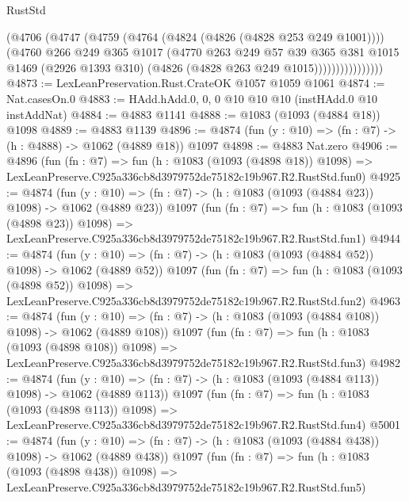 \begin{lexlean}{RustStd}
\begin{coremodule}
                      (@4706
                        (@4747
                          (@4759
                            (@4764 (@4824 (@4826 (@4828 @253 @249 @1001))))
                            (@4760
                              @266
                              @249
                              @365
                              @1017
                              (@4770
                                @263
                                @249
                                @57
                                @39
                                @365
                                @381
                                @1015
                                @1469
                                (@2926 @1393 @310)
                                (@4826 (@4828 @263 @249 @1015))))))))))))))))
@4873 := LexLeanPreservation.Rust.CrateOK @1057 @1059 @1061
@4874 := Nat.casesOn.{0}
@4883 := HAdd.hAdd.{0, 0, 0} @10 @10 @10 (instHAdd.{0} @10 instAddNat)
@4884 := @4883 @1141
@4888 := @1083 (@1093 (@4884 @18)) @1098
@4889 := @4883 @1139
@4896 := @4874 (fun (y : @10) => (fn : @7) -> (h : @4888) -> @1062 (@4889 @18)) @1097
@4898 := @4883 Nat.zero
@4906 := @4896
    (fun (fn : @7) =>
    fun (h : @1083 (@1093 (@4898 @18)) @1098) =>
    LexLeanPreserve.C925a336cb8d3979752de75182c19b967.R2.RustStd.fun0)
@4925 := @4874
    (fun (y : @10) => (fn : @7) -> (h : @1083 (@1093 (@4884 @23)) @1098) -> @1062 (@4889 @23))
    @1097
    (fun (fn : @7) =>
    fun (h : @1083 (@1093 (@4898 @23)) @1098) =>
    LexLeanPreserve.C925a336cb8d3979752de75182c19b967.R2.RustStd.fun1)
@4944 := @4874
    (fun (y : @10) => (fn : @7) -> (h : @1083 (@1093 (@4884 @52)) @1098) -> @1062 (@4889 @52))
    @1097
    (fun (fn : @7) =>
    fun (h : @1083 (@1093 (@4898 @52)) @1098) =>
    LexLeanPreserve.C925a336cb8d3979752de75182c19b967.R2.RustStd.fun2)
@4963 := @4874
    (fun (y : @10) => (fn : @7) -> (h : @1083 (@1093 (@4884 @108)) @1098) -> @1062 (@4889 @108))
    @1097
    (fun (fn : @7) =>
    fun (h : @1083 (@1093 (@4898 @108)) @1098) =>
    LexLeanPreserve.C925a336cb8d3979752de75182c19b967.R2.RustStd.fun3)
@4982 := @4874
    (fun (y : @10) => (fn : @7) -> (h : @1083 (@1093 (@4884 @113)) @1098) -> @1062 (@4889 @113))
    @1097
    (fun (fn : @7) =>
    fun (h : @1083 (@1093 (@4898 @113)) @1098) =>
    LexLeanPreserve.C925a336cb8d3979752de75182c19b967.R2.RustStd.fun4)
@5001 := @4874
    (fun (y : @10) => (fn : @7) -> (h : @1083 (@1093 (@4884 @438)) @1098) -> @1062 (@4889 @438))
    @1097
    (fun (fn : @7) =>
    fun (h : @1083 (@1093 (@4898 @438)) @1098) =>
    LexLeanPreserve.C925a336cb8d3979752de75182c19b967.R2.RustStd.fun5)

\end{coremodule}
\end{lexlean}
